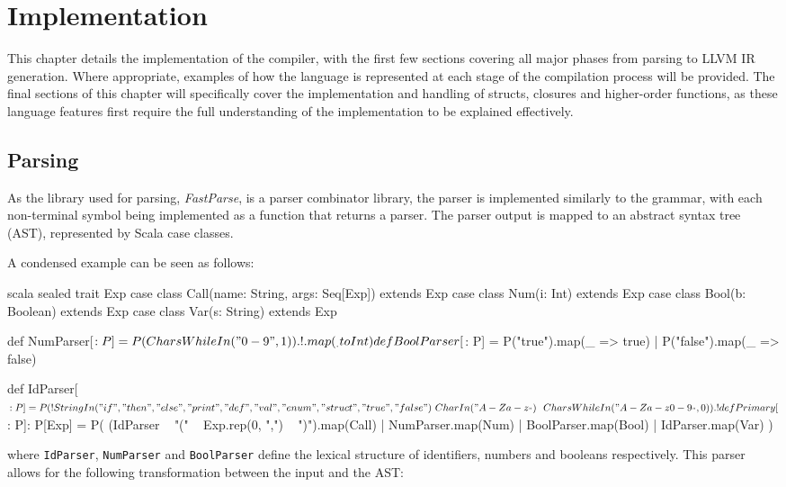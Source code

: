 \chapter{Implementation}

This chapter details the implementation of the compiler, with the first few sections covering all
major phases from parsing to LLVM IR generation. Where appropriate, examples of how the language is
represented at each stage of the compilation process will be provided. The final sections of this
chapter will specifically cover the implementation and handling of structs, closures and
higher-order functions, as these language features first require the full understanding of the
implementation to be explained effectively.

\section{Parsing}

As the library used for parsing, \emph{FastParse}, is a parser combinator library, the parser is
implemented similarly to the grammar, with each non-terminal symbol being implemented as a function
that returns a parser. The parser output is mapped to an abstract syntax tree (AST), represented by
Scala case classes.

A condensed example can be seen as follows:

\begin{code}{scala}
    sealed trait Exp
    case class Call(name: String, args: Seq[Exp]) extends Exp
    case class Num(i: Int) extends Exp
    case class Bool(b: Boolean) extends Exp
    case class Var(s: String) extends Exp

    def NumParser[$: P] =
        P(CharsWhileIn("0-9", 1)).!.map(_.toInt)

    def BoolParser[$: P] =
        P("true").map(_ => true) |
        P("false").map(_ => false)

    def IdParser[$: P] = P(
        !StringIn("if", "then", "else", "print", "def", "val", "enum", "struct", "true", "false")
        ~ CharIn("A-Za-z_") ~~ CharsWhileIn("A-Za-z0-9_", 0)
    ).!

    def Primary[$: P]: P[Exp] = P(
        (IdParser ~ "(" ~ Exp.rep(0, ",") ~ ")").map(Call) |
        NumParser.map(Num) |
        BoolParser.map(Bool) |
        IdParser.map(Var)
    )
\end{code}

\noindent where \texttt{IdParser}, \texttt{NumParser} and \texttt{BoolParser} define the lexical
structure of identifiers, numbers and booleans respectively. This parser allows for the following
transformation between the input and the AST:

